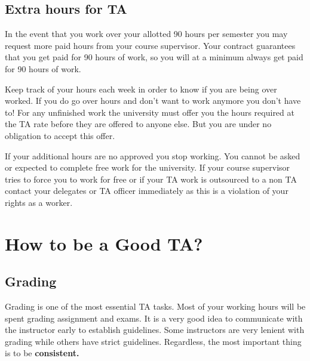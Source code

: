\subsection{Extra hours for TA}   
    In the event that you work over your allotted 90 hours per semester you may request more paid hours from your course supervisor. Your contract guarantees that you get paid for 90 hours of work, so you will at a minimum always get paid for 90 hours of work. 

    Keep track of your hours each week in order to know if you are being over worked. If you do go over hours and don't want to work anymore you don't have to! For any unfinished work the university must offer you the hours required at the TA rate before they are offered to anyone else. But you are under no obligation to accept this offer.

    If your additional hours are no approved you stop working. You cannot be asked or expected to complete free work for the university. If your course supervisor tries to force you to work for free or if your TA work is outsourced to a non TA contact your delegates or TA officer immediately as this is a violation of your rights as a worker.

\section{How to be a Good TA?}
\subsection{Grading}
Grading is one of the most essential TA tasks. Most of your working hours will be spent grading assignment and exams. It is a very good idea to communicate with the instructor early to establish guidelines. Some instructors are very lenient with grading while others have strict guidelines. Regardless, the most important thing is to be \textbf{consistent.} \vspace{5pt}

